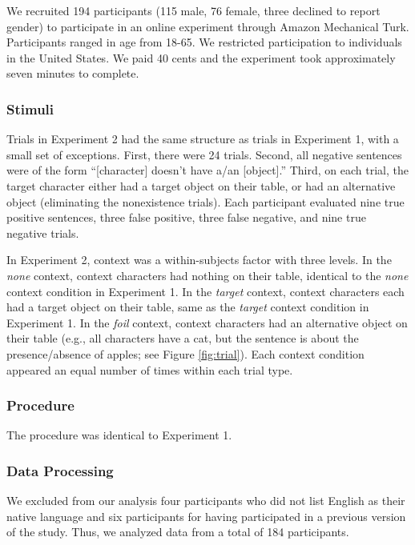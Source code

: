 \documentclass[man, noapacite]{apa2}
\begin{document}
We recruited 194 participants (115 male, 76 female, three declined to report gender) to participate in an online experiment through Amazon Mechanical Turk.  Participants ranged in age from 18-65.  We restricted participation to individuals in the United States. We paid 40 cents and the experiment took approximately seven minutes to complete.  

\subsubsection{Stimuli}

Trials in Experiment 2 had the same structure as trials in Experiment 1, with a small set of exceptions. First, there were 24 trials. Second, all negative sentences were of the form ``[character] doesn't have a/an [object].'' Third, on each trial, the target character either had a target object on their table, or had an alternative object (eliminating the nonexistence trials).  Each participant evaluated nine true positive sentences, three false positive, three false negative, and nine true negative trials.

In Experiment 2, context was a within-subjects factor with three levels. In the \emph{none} context, context characters had nothing on their table, identical to the \emph{none} context condition in Experiment 1. In the \emph{target} context, context characters each had a target object on their table, same as the \emph{target} context condition in Experiment 1. In the \emph{foil} context, context characters had an alternative object on their table (e.g., all characters have a cat, but the sentence is about the presence/absence of apples; see Figure \ref{fig:trial}).  Each context condition appeared an equal number of times within each trial type.  

\subsubsection{Procedure}

The procedure was identical to Experiment 1.

\subsubsection{Data Processing}

We excluded from our analysis four participants who did not list English as their native language and six participants for having participated in a previous version of the study.  Thus, we analyzed data from a total of 184 participants.  
\end{document}
